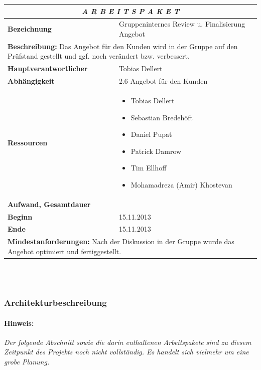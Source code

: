 \documentclass[fontsize=12pt,paper=a4,twoside]{scrartcl}
\begin{document}
\begin{tabular}{p{7.5cm}|p{7.5cm}}\toprule
\multicolumn{2}{c}{\textbf{\textit{A R B E I T S P A K E T \quad 2.8}}} \\ \toprule \hline
\textbf{Bezeichnung} & Gruppeninternes Review u. Finalisierung Angebot\\\hline
\multicolumn{2}{p{15cm}}{\textbf{Beschreibung:} \newline 
Das Angebot für den Kunden wird in der Gruppe auf den Prüfstand gestellt und ggf. noch verändert bzw. verbessert.}  \\\hline
\textbf{Hauptverantwortlicher} & Tobias Dellert \\\hline
\textbf{Abhängigkeit} & 2.6 Angebot für den Kunden\\\hline
\textbf{Ressourcen} & \begin{itemize} 
\itemsep0pt
\item Tobias Dellert
\item Sebastian Bredehöft
\item Daniel Pupat
\item Patrick Damrow
\item Tim Ellhoff
\item Mohamadreza (Amir) Khostevan
\end{itemize} \\\hline
\textbf{Aufwand, Gesamtdauer} & \\\hline
\textbf{Beginn} & 15.11.2013 \\\hline
\textbf{Ende} & 15.11.2013\\\hline
\multicolumn{2}{p{15cm}}{\textbf{Mindestanforderungen: } \newline
Nach der Diskussion in der Gruppe wurde das Angebot optimiert und fertiggestellt. }  \\ \toprule
\end{tabular} \\\\

\subsubsection{Architekturbeschreibung}\label{aps}

\paragraph{Hinweis:} \textit{Der folgende Abschnitt sowie die darin enthaltenen Arbeitspakete sind zu diesem Zeitpunkt des Projekts noch nicht vollständig. Es handelt sich vielmehr um eine grobe Planung.}\\
\end{document}
